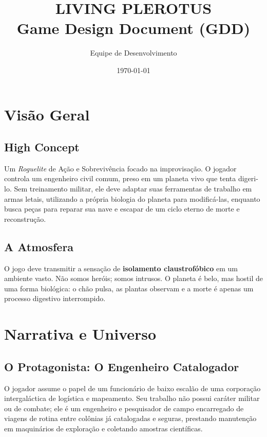 \documentclass[a4paper,12pt]{report}
\title{\textbf{LIVING PLEROTUS}\\ \large Game Design Document (GDD)}
\author{Equipe de Desenvolvimento}
\date{\today}
\begin{document}
\maketitle
\tableofcontents

\chapter{Visão Geral}

\section{High Concept}
Um \textit{Roguelite} de Ação e Sobrevivência focado na improvisação. O jogador controla um engenheiro civil comum, preso em um planeta vivo que tenta digeri-lo. Sem treinamento militar, ele deve adaptar suas ferramentas de trabalho em armas letais, utilizando a própria biologia do planeta para modificá-las, enquanto busca peças para reparar sua nave e escapar de um ciclo eterno de morte e reconstrução.

\section{A Atmosfera}
O jogo deve transmitir a sensação de \textbf{isolamento claustrofóbico} em um ambiente vasto. Não somos heróis; somos intrusos. O planeta é belo, mas hostil de uma forma biológica: o chão pulsa, as plantas observam e a morte é apenas um processo digestivo interrompido.

\chapter{Narrativa e Universo}

\section{O Protagonista: O Engenheiro Catalogador}
O jogador assume o papel de um funcionário de baixo escalão de uma corporação intergaláctica de logística e mapeamento. Seu trabalho não possui caráter militar ou de combate; ele é um engenheiro e pesquisador de campo encarregado de viagens de rotina entre colônias já catalogadas e seguras, prestando manutenção em maquinários de exploração e coletando amostras científicas.
\end{document}
